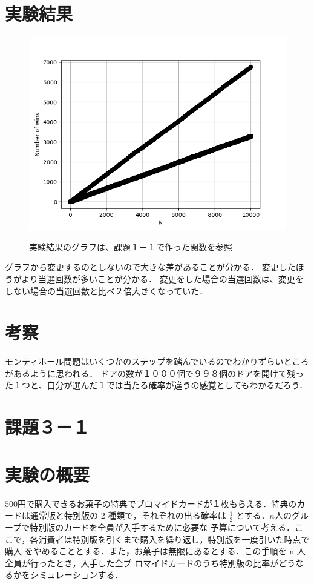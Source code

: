 \documentclass[fleqn, a4paper. 12pt]{ltjsarticle} %
\begin{document}
\section*{実験結果}
\begin{figure}[tb]
  \centering
  \includegraphics[width=\textwidth]{my_plot2-3.png}
  \label{f4}
  \caption{実験結果のグラフは、課題１－１で作った関数を参照}
\end{figure}
グラフから変更するのとしないので大きな差があることが分かる．
変更したほうがより当選回数が多いことが分かる．
変更をした場合の当選回数は、変更をしない場合の当選回数と比べ２倍大きくなっていた．
\section*{考察}
モンティホール問題はいくつかのステップを踏んでいるのでわかりずらいところがあるように思われる．
ドアの数が１０００個で９９８個のドアを開けて残った１つと、自分が選んだ１では当たる確率が違うの感覚としてもわかるだろう．

\newpage

\section*{課題３－１}
\section*{実験の概要}
$500$円で購入できるお菓子の特典でブロマイドカードが１枚もらえる．特典のカードは通常版と特別版の 2
種類で，それぞれの出る確率は $\frac{1}{2}$ とする．$n$人のグループで特別版のカードを全員が入手するために必要な
予算について考える．ここで，各消費者は特別版を引くまで購入を繰り返し，特別版を一度引いた時点で購入
をやめることとする．また，お菓子は無限にあるとする．この手順を n 人全員が行ったとき，入手した全ブ
ロマイドカードのうち特別版の比率がどうなるかをシミュレーションする．
\end{document}

